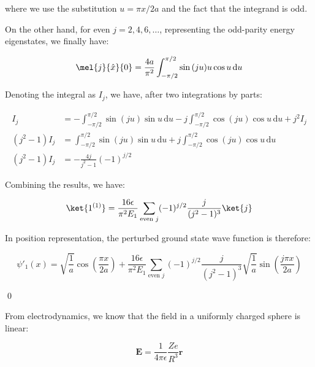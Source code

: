 \documentclass[12pt]{article}
\begin{document}
where we use the substitution $u = \pi x/2a$ and the fact that the integrand is odd.

On the other hand, for even $j = 2, 4, 6, \ldots$, representing the odd-parity energy eigenstates, we finally have:

\begin{equation}
    \begin{split}
        \mel{j}{\hat{x}}{0} &= \frac{4a}{\pi^{2}} \int_{-\pi/2}^{\pi/2} \sin{(ju)} u \cos{u} \, \mathrm{d}u \\
    \end{split}
\end{equation}

Denoting the integral as $I_{j}$, we have, after two integrations by parts:

\begin{equation}
    \begin{split}
        I_{j} &= -\int_{-\pi/2}^{\pi/2} \sin{(ju)} \sin{u} \, \mathrm{d}u - j \int_{-\pi/2}^{\pi/2} \cos{(ju)} \cos{u} \, \mathrm{d}u + j^{2} I_{j} \\
        (j^{2} - 1) I_{j} &= \int_{-\pi/2}^{\pi/2} \sin{(ju)} \sin{u} \, \mathrm{d}u + j \int_{-\pi/2}^{\pi/2} \cos{(ju)} \cos{u} \, \mathrm{d}u \\
        (j^{2} - 1) I_{j} &= -\frac{4j}{j^{2} - 1} (-1)^{j/2}
    \end{split}
\end{equation}

Combining the results, we have:

\begin{equation}
    \ket{1^{(1)}} = \frac{16\epsilon}{\pi^{2} E_{1}} \sum_{\text{even } j} (-1)^{j/2} \frac{j}{(j^{2} - 1)^{3}} \ket{j}
\end{equation}

In position representation, the perturbed ground state wave function is therefore:

\begin{equation}
    \psi'_{1}(x) = \sqrt{\frac{1}{a}} \cos{\left( \frac{\pi x}{2a} \right)} + \frac{16\epsilon}{\pi^{2} E_{1}} \sum_{\text{even } j} (-1)^{j/2} \frac{j}{(j^{2} - 1)^{3}} \sqrt{\frac{1}{a}} \sin{\left( \frac{j\pi x}{2a} \right)}
\end{equation}

\qed


From electrodynamics, we know that the field in a uniformly charged sphere is linear:

\begin{equation}
    \mathbf{E} = \frac{1}{4\pi\epsilon} \frac{Ze}{R^{3}} \mathbf{r}
\end{equation}
\end{document}
